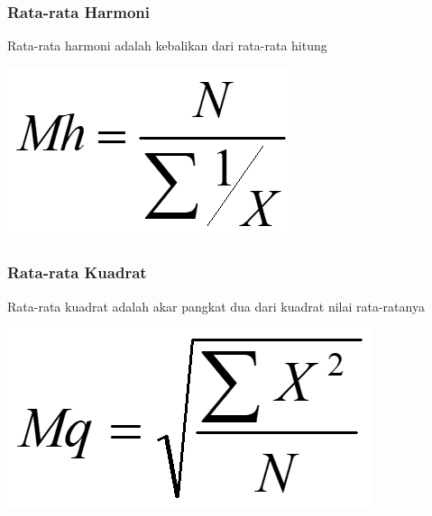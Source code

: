 \documentclass[main.tex]{subfiles}
\begin{document}
\begin{frame}[c]
	\frametitle{Rata-rata Harmoni}
	Rata-rata harmoni adalah kebalikan dari rata-rata hitung

	\begin{center}
		\includegraphics[scale=.5]{figures/mean6}
	\end{center}

\end{frame}

\begin{frame}[c]
	\frametitle{Rata-rata Kuadrat}
	Rata-rata kuadrat adalah akar pangkat dua dari kuadrat nilai rata-ratanya

	\begin{center}
		\includegraphics[scale=.5]{figures/mean7}
	\end{center}

\end{frame}
\end{document}
